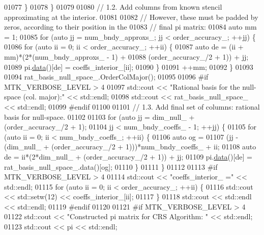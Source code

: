 \begin{DoxyCode}
{{01077     \}
01078   \}
01079 
01080   \textcolor{comment}{// 1.2. Add columns from known stencil approximating at the interior.}
01081 
01082   \textcolor{comment}{// However, these must be padded by zeros, according to their position in the}
01083   \textcolor{comment}{// final pi matrix:}
01084   \textcolor{keyword}{auto} mm = 1;
01085   \textcolor{keywordflow}{for} (\textcolor{keyword}{auto} jj = num\_bndy\_approxs\_; jj < order\_accuracy\_; ++jj) \{
01086     \textcolor{keywordflow}{for} (\textcolor{keyword}{auto} ii = 0; ii < order\_accuracy\_; ++ii) \{
01087       \textcolor{keyword}{auto} de = (ii + mm)*(2*(num\_bndy\_approxs\_ - 1) +
01088         (order\_accuracy\_/2 + 1)) + jj;
01089       pi.\hyperlink{classmtk_1_1DenseMatrix_a0c33b8a9e01d157c61ddbdf807c25d84}{data}()[de] = coeffs\_interior\_[ii];
01090     \}
01091     ++mm;
01092   \}
01093 
01094   rat\_basis\_null\_space\_.OrderColMajor();
01095 
01096 \textcolor{preprocessor}{  #if MTK\_VERBOSE\_LEVEL > 4}
01097   std::cout << \textcolor{stringliteral}{"Rational basis for the null-space (col. major):"} << std::endl;
01098   std::cout << rat\_basis\_null\_space\_ << std::endl;
01099 \textcolor{preprocessor}{  #endif}
01100 
01101   \textcolor{comment}{// 1.3. Add final set of columns: rational basis for null-space.}
01102 
01103   \textcolor{keywordflow}{for} (\textcolor{keyword}{auto} jj = dim\_null\_ + (order\_accuracy\_/2 + 1);
01104        jj < num\_bndy\_coeffs\_ - 1; ++jj) \{
01105     \textcolor{keywordflow}{for} (\textcolor{keyword}{auto} ii = 0; ii < num\_bndy\_coeffs\_; ++ii) \{
01106       \textcolor{keyword}{auto} og =
01107         (jj - (dim\_null\_ + (order\_accuracy\_/2 + 1)))*num\_bndy\_coeffs\_ + ii;
01108       \textcolor{keyword}{auto} de = ii*(2*dim\_null\_ + (order\_accuracy\_/2 + 1)) + jj;
01109       pi.\hyperlink{classmtk_1_1DenseMatrix_a0c33b8a9e01d157c61ddbdf807c25d84}{data}()[de] = rat\_basis\_null\_space\_.data()[og];
01110     \}
01111   \}
01112 
01113 \textcolor{preprocessor}{  #if MTK\_VERBOSE\_LEVEL > 4}
01114   std::cout << \textcolor{stringliteral}{"coeffs\_interior\_ ="} << std::endl;
01115   \textcolor{keywordflow}{for} (\textcolor{keyword}{auto} ii = 0; ii < order\_accuracy\_; ++ii) \{
01116     std::cout << std::setw(12) << coeffs\_interior\_[ii];
01117   \}
01118   std::cout << std::endl << std::endl;
01119 \textcolor{preprocessor}{  #endif}
01120 
01121 \textcolor{preprocessor}{  #if MTK\_VERBOSE\_LEVEL > 4}
01122   std::cout << \textcolor{stringliteral}{"Constructed pi matrix for CRS Algorithm: "} << std::endl;
01123   std::cout << pi << std::endl;
}}
\end{DoxyCode}
